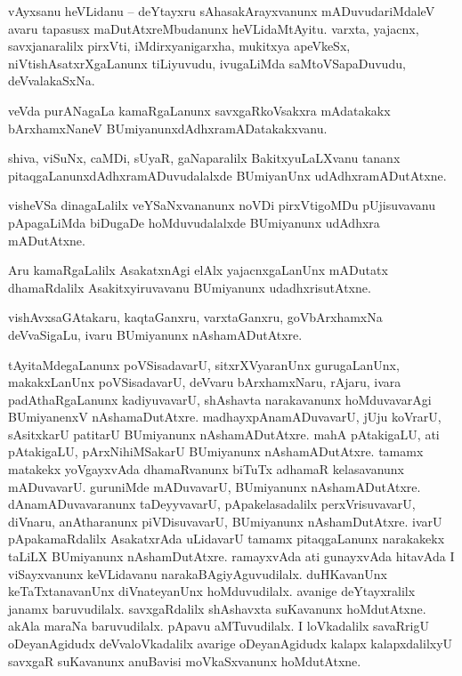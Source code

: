 \documentclass{article}
\begin{document}
\begin{mng}%
vAyxsanu heVLidanu -- deYtayxru sAhasakArayxvanunx mADuvudariMdaleV avaru tapasusx 
maDutAtxreMbudanunx heVLidaMtAyitu. varxta, yajacnx, savxjanaralilx pirxVti, iMdirxyanigarxha, 
mukitxya apeVkeSx, niVtishAsatxrXgaLanunx tiLiyuvudu, ivugaLiMda saMtoVSapaDuvudu, deVvalakaSxNa.
\end{mng}

\begin{mng}%
veVda purANagaLa kamaRgaLanunx savxgaRkoVsakxra mAdatakakx bArxhamxNaneV 
BUmiyanunxdAdhxramADatakakxvanu.
\end{mng}

\begin{mng}%
shiva, viSuNx, caMDi, sUyaR, gaNaparalilx BakitxyuLaLXvanu tananx 
pitaqgaLanunxdAdhxramADuvudalalxde BUmiyanUnx udAdhxramADutAtxne.
\end{mng}

\begin{mng}%
visheVSa dinagaLalilx veYSaNxvananunx noVDi pirxVtigoMDu pUjisuvavanu pApagaLiMda biDugaDe 
hoMduvudalalxde BUmiyanunx udAdhxra mADutAtxne.
\end{mng}

\begin{mng}%
Aru kamaRgaLalilx AsakatxnAgi elAlx yajacnxgaLanUnx mADutatx dhamaRdalilx Asakitxyiruvavanu 
BUmiyanunx udadhxrisutAtxne.
\end{mng}

\begin{mng}%
vishAvxsaGAtakaru, kaqtaGanxru, varxtaGanxru, goVbArxhamxNa deVvaSigaLu, ivaru BUmiyanunx 
nAshamADutAtxre.
\end{mng}

\begin{mng}%
tAyitaMdegaLanunx poVSisadavarU, sitxrXVyaranUnx gurugaLanUnx, makakxLanUnx poVSisadavarU, deVvaru 
bArxhamxNaru, rAjaru, ivara padAthaRgaLanunx kadiyuvavarU, shAshavta narakavanunx hoMduvavarAgi 
BUmiyanenxV nAshamaDutAtxre. madhayxpAnamADuvavarU, jUju koVrarU, sAsitxkarU patitarU BUmiyanunx 
nAshamADutAtxre. mahA pAtakigaLU, ati pAtakigaLU, pArxNihiMSakarU BUmiyanunx nAshamADutAtxre. 
tamamx matakekx yoVgayxvAda dhamaRvanunx biTuTx adhamaR kelasavanunx mADuvavarU. guruniMde 
mADuvavarU, BUmiyanunx  nAshamADutAtxre. dAnamADuvavaranunx taDeyyvavarU, pApakelasadalilx 
perxVrisuvavarU, diVnaru, anAtharanunx piVDisuvavarU, BUmiyanunx nAshamDutAtxre. ivarU 
pApakamaRdalilx AsakatxrAda uLidavarU tamamx pitaqgaLanunx narakakekx taLiLX BUmiyanunx 
nAshamDutAtxre. ramayxvAda ati gunayxvAda hitavAda I viSayxvanunx keVLidavanu 
narakaBAgiyAguvudilalx. duHKavanUnx keTaTxtanavanUnx diVnateyanUnx hoMduvudilalx. avanige 
deYtayxralilx janamx baruvudilalx. savxgaRdalilx shAshavxta suKavanunx hoMdutAtxne. akAla maraNa 
baruvudilalx. pApavu aMTuvudilalx. I loVkadalilx savaRrigU oDeyanAgidudx deVvaloVkadalilx avarige 
oDeyanAgidudx kalapx kalapxdalilxyU savxgaR suKavanunx anuBavisi moVkaSxvanunx hoMdutAtxne.
\end{mng}
\end{document}
